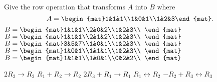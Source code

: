 

\begin{Exercise}[
name={},
title={}, 
difficulty=0,
origin={\cite{GH}}]
Give the row operation that transforms $A$ into $B$ where $$A = \begin{mat}1&1&1\\1&0&1\\1&2&3\end{mat}.$$
\Question $B = \begin{mat}1&1&1\\2&0&2\\1&2&3\\ \end{mat}$
\Question $B = \begin{mat}1&1&1\\2&1&2\\1&2&3\\ \end{mat}$
\Question $B = \begin{mat}3&5&7\\1&0&1\\1&2&3\\ \end{mat}$
\Question $B = \begin{mat}1&0&1\\1&1&1\\1&2&3\\ \end{mat}$
\Question $B = \begin{mat}1&1&1\\1&0&1\\0&2&2\\ \end{mat}$

\end{Exercise}

\begin{Answer}
\Question $2R_2\rightarrow R_2$ 
\Question $R_1+R_2\rightarrow R_2$
\Question $2R_3+R_1\rightarrow R_1$
\Question $R_1\leftrightarrow R_2$
\Question $-R_2+R_3\leftrightarrow R_3$

\end{Answer}
